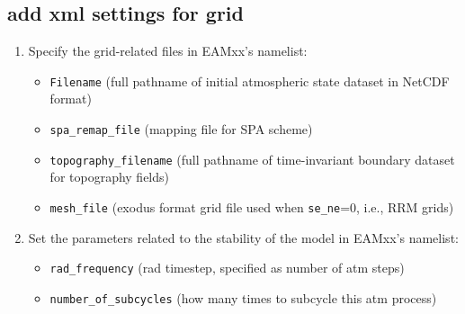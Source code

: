 \documentclass[journal abbreviation, manuscript]{copernicus}
\begin{document}
\subsection{add xml settings for grid}

\begin{enumerate}
  \item Specify the grid-related files in EAMxx's namelist:
    \begin{itemize}
    \item \verb|Filename| (full pathname of initial atmospheric state dataset in NetCDF format)
    \item \verb|spa_remap_file| (mapping file for SPA scheme) 
    \item \verb|topography_filename| (full pathname of time-invariant boundary dataset for topography fields)
    \item \verb|mesh_file| (exodus format grid file used when \verb|se_ne|=0, i.e., RRM grids)
    \end{itemize}

    
  \item Set the parameters related to the stability of the model in EAMxx's namelist:
    \begin{itemize}
    \item \verb|rad_frequency| (rad timestep, specified as number of atm steps)
    \item \verb|number_of_subcycles| (how many times to subcycle this atm process)
    \end{itemize}


\end{enumerate}
\end{document}
